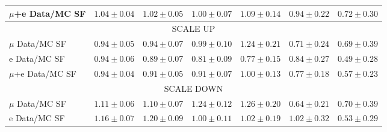 \begin{table}[!h]
\begin{center}
{\begin{tabular}{l||c||c|c|c|c|c}
\hline
$\mu$+e Data/MC SF 		  & $1.04 \pm 0.04$ & $1.02 \pm 0.05$ & $1.00 \pm 0.07$ & $1.09 \pm 0.14$ & $0.94 \pm 0.22$ & $0.72 \pm 0.30$ \\
\hline
\hline
\multicolumn{7}{c}{SCALE UP} \\
\hline
$\mu$ Data/MC SF 	  & $0.94 \pm 0.05$ & $0.94 \pm 0.07$ & $0.99 \pm 0.10$ & $1.24 \pm 0.21$ & $0.71 \pm 0.24$ & $0.69 \pm 0.39$ \\
\hline
e Data/MC SF 	  & $0.94 \pm 0.06$ & $0.89 \pm 0.07$ & $0.81 \pm 0.09$ & $0.77 \pm 0.15$ & $0.84 \pm 0.27$ & $0.49 \pm 0.28$ \\
\hline
$\mu$+e Data/MC SF 		  & $0.94 \pm 0.04$ & $0.91 \pm 0.05$ & $0.91 \pm 0.07$ & $1.00 \pm 0.13$ & $0.77 \pm 0.18$ & $0.57 \pm 0.23$ \\
\hline
\hline
\multicolumn{7}{c}{SCALE DOWN} \\
\hline
$\mu$ Data/MC SF 	  & $1.11 \pm 0.06$ & $1.10 \pm 0.07$ & $1.24 \pm 0.12$ & $1.26 \pm 0.20$ & $0.64 \pm 0.21$ & $0.70 \pm 0.39$ \\
\hline
e Data/MC SF 	  & $1.16 \pm 0.07$ & $1.20 \pm 0.09$ & $1.00 \pm 0.11$ & $1.02 \pm 0.19$ & $1.02 \pm 0.32$ & $0.53 \pm 0.29$ \\

\end{tabular}}
\end{center}
\end{table}
